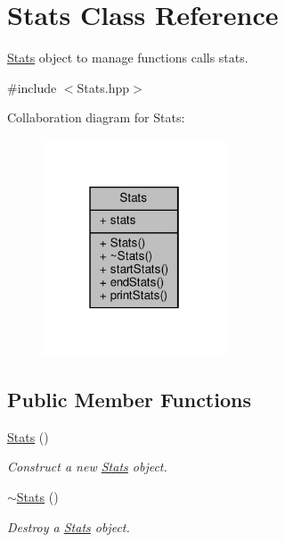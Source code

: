 \hypertarget{class_stats}{}\section{Stats Class Reference}
\label{class_stats}


\hyperlink{class_stats}{Stats} object to manage functions calls stats.  




{\ttfamily \#include $<$Stats.\+hpp$>$}



Collaboration diagram for Stats\+:
\nopagebreak
\begin{figure}[H]
\begin{center}
\leavevmode
\includegraphics[width=154pt]{class_stats__coll__graph}
\end{center}
\end{figure}
\subsection*{Public Member Functions}
\begin{DoxyCompactItemize}
\item 
\mbox{\label{class_stats_aed79e2b7167040dada2cb2ba8b90ad9b}} 
\hyperlink{class_stats_aed79e2b7167040dada2cb2ba8b90ad9b}{Stats} ()
\begin{DoxyCompactList}\small\item\em Construct a new \hyperlink{class_stats}{Stats} object. \end{DoxyCompactList}\item 
\mbox{\label{class_stats_ad32aee12c7d460325f8d7a31159e8acc}} 
\hyperlink{class_stats_ad32aee12c7d460325f8d7a31159e8acc}{$\sim$\+Stats} ()
\begin{DoxyCompactList}\small\item\em Destroy a \hyperlink{class_stats}{Stats} object. \end{DoxyCompactList}\end{DoxyCompactItemize}
